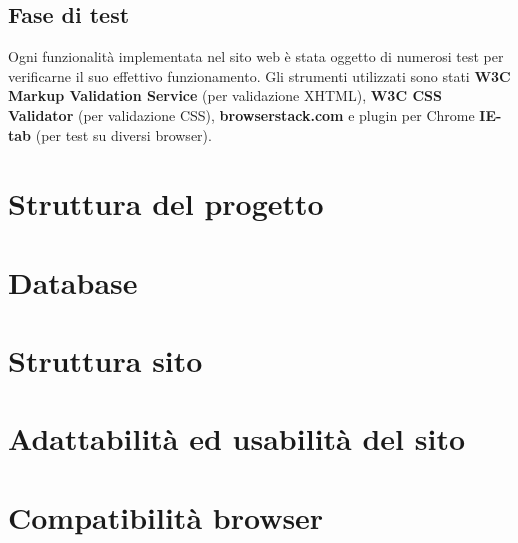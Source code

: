\subsection{Fase di test}

Ogni funzionalità implementata nel sito web è stata oggetto di numerosi test per verificarne il suo effettivo funzionamento. Gli strumenti utilizzati sono stati \textbf{W3C Markup Validation Service} (per validazione XHTML), \textbf{W3C CSS Validator} (per validazione CSS), \textbf{browserstack.com} e plugin per Chrome \textbf{IE-tab} (per test su diversi browser).

\section{Struttura del progetto}


\section{Database}


\section{Struttura sito}


\section{Adattabilità ed usabilità del sito}


\section{Compatibilità browser}


